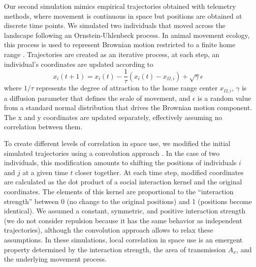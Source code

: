 \documentclass[letterpaper]{article}
\begin{document}
Our second simulation mimics empirical trajectories obtained with telemetry methods, where movement is continuous in space but positions are obtained at discrete time points. We simulated two individuals that moved across the landscape following an Ornstein-Uhlenbeck process. In animal movement ecology, this process is used to represent Brownian motion restricted to a finite home range \citep{Hooten2017a, Blackwell1997}. Trajectories are created as an iterative process, at each step, an individual's coordinates are updated according to %
\begin{equation}
	x_i(t+1)=x_i(t)-\frac{1}{\tau}(x_i(t)-x_{\Omega,i})+\sqrt{\gamma}\epsilon
\end{equation}
where $1/\tau$ represents the degree of attraction to the home range center $x_{\Omega,i}$, $\gamma$ is a diffusion parameter that defines the scale of movement, and $\epsilon$ is a random value from a standard normal distribution that drives the Brownian motion component. The x and y coordinates are updated separately, effectively assuming no correlation between them. 

To create different levels of correlation in space use, we modified the initial simulated trajectories using a convolution approach \citep[][, Appendix 7]{Scharf2018}. In the case of two individuals, this modification amounts to shifting the positions of individuals $i$ and $j$ at a given time $t$ closer together. At each time step, modified coordinates are calculated as the dot product of a social interaction kernel and the original coordinates. The elements of this kernel are proportional to the ``interaction strength'' between 0 (no change to the original positions) and 1 (positions become identical). We assumed a constant, symmetric, and positive interaction strength (we do not consider repulsion because it has the same behavior as independent trajectories), although the convolution approach allows to relax these assumptions. In these simulations, local correlation in space use is an emergent property determined by the interaction strength, the area of transmission $A_x$, and the underlying movement process. 
\end{document}
